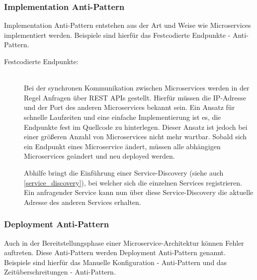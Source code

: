\subsubsection*{Implementation Anti-Pattern}

Implementation Anti-Pattern entstehen aus der Art und Weise wie Microservices implementiert werden. Beispiele sind hierfür das \glqq Festcodierte Endpunkte\grqq{} - Anti-Pattern.

\begin{description}
    \item[Festcodierte Endpunkte:]\hfill \\
    Bei der synchronen Kommunikation zwischen Microservices werden in der Regel Anfragen über REST APIs gestellt. Hierfür müssen die IP-Adresse und der Port des anderen Microservices bekannt sein. Ein Ansatz für schnelle Laufzeiten und eine einfache Implementierung ist es, die Endpunkte fest im Quellcode zu hinterlegen. Dieser Ansatz ist jedoch bei einer größeren Anzahl von Microservices nicht mehr wartbar. Sobald sich ein Endpunkt eines Microservice ändert, müssen alle abhängigen Microservices geändert und neu deployed werden.

    Abhilfe bringt die Einführung einer Service-Discovery (siehe auch \autoref{service_discovery}), bei welcher sich die einzelnen Services registrieren. Ein anfragender Service kann nun über diese Service-Discovery die aktuelle Adresse des anderen Services erhalten.

\end{description}

\subsubsection*{Deployment Anti-Pattern}

Auch in der Bereitstellungsphase einer Microservice-Architektur können Fehler auftreten. Diese Anti-Pattern werden Deployment Anti-Pattern genannt. Beispiele sind hierfür das \glqq Manuelle Konfiguration\grqq{} - Anti-Pattern und das \glqq Zeitüberschreitungen\grqq{} - Anti-Pattern.

